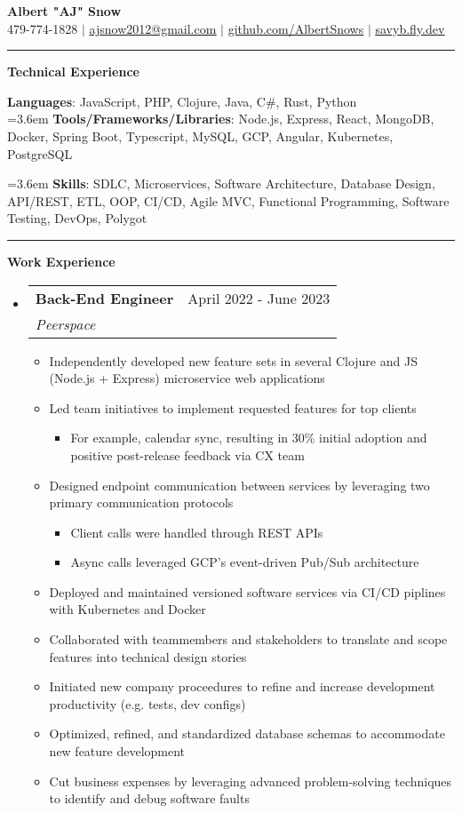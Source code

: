 \documentclass[letterpaper,11pt]{article}
\makeatletter
\newcommand{\resumeItem}[1]{
  \item\small{
    {#1 \vspace{-2pt}}
  }
}
\newcommand{\resumeSubheading}[4]{
  \vspace{-2pt}\item
    \begin{tabular*}{0.97\textwidth}[t]{l@{\extracolsep{\fill}}r}
      \textbf{#1} & #2 \\
      \textit{\small#3} & \textit{\small #4} \\
    \end{tabular*}\vspace{0pt}
}
\newcommand{\resumeSubHeadingListStart}{\begin{itemize}[leftmargin=0.15cm, label={}]}
\newcommand{\resumeSubHeadingListEnd}{\end{itemize}}
\newcommand{\resumeItemListStart}{\begin{itemize}}
\newcommand{\resumeItemListEnd}{\end{itemize}\vspace{-5pt}}
\makeatother
\begin{document}
\textbf{\normalshape \Large \textcolor{magic_blue}{Albert "AJ" Snow}} \\ \vspace{3pt}
\small 479-774-1828 $|$ 
\href{ mailto:ajsnow2012@gmail.com }
{\underline{ajsnow2012@gmail.com}} $|$
\href{https://github.com/AlbertSnows}{\underline{github.com/AlbertSnows}}
$|$ \href{https://savyb.fly.dev/}{\underline{savyb.fly.dev}}
\noindent\rule{19.5cm}{0.4pt}


%
\textbf{\large \textcolor{magic_blue}{Technical Experience} }
\begin{onehalfspace}

    \textbf{ Languages}{: JavaScript, PHP, Clojure, Java, 
    C\#, Rust, Python } \\

    \hangindent=3.6em
    \textbf{ Tools/Frameworks/Libraries}{: 
    Node.js, Express, React, MongoDB, Docker, Spring Boot, 
    Typescript, MySQL, GCP, Angular, Kubernetes, PostgreSQL } \\
\end{onehalfspace}

\hangindent=3.6em
\textbf{ Skills}{: }
SDLC, Microservices, Software Architecture, Database Design, 
API/REST,  ETL, 
OOP, CI/CD, Agile
MVC, Functional Programming, Software Testing, 
DevOps, Polygot

\noindent\rule{19.5cm}{0.4pt}

\textbf{\large \textcolor{magic_blue}{Work Experience}}
\resumeSubHeadingListStart
\resumeSubheading
{Back-End Engineer}{April 2022 - June 2023}
{Peerspace}{}
\resumeItemListStart
\resumeItem{ Independently developed new feature sets in several Clojure and JS (Node.js + Express) microservice web applications}
\resumeItem{ Led team initiatives to implement requested features for top clients }
\begin{itemize}
  \item For example, calendar sync, resulting in 30\% initial adoption and positive post-release feedback via CX team
\end{itemize}
\resumeItem{ Designed endpoint communication between services by leveraging two primary communication protocols}
\begin{itemize}
  \item Client calls were handled through REST APIs
  \item Async calls leveraged GCP's event-driven Pub/Sub architecture
\end{itemize}
\resumeItem{ Deployed and maintained versioned software services via CI/CD piplines with Kubernetes and Docker }
\resumeItem{ Collaborated with teammembers and stakeholders to translate and scope features into technical design stories}
\resumeItem{ Initiated new company proceedures to refine and increase development productivity (e.g. tests, dev configs)}
\resumeItem{ Optimized, refined, and standardized database schemas to accommodate new feature development}
\resumeItem{ Cut business expenses by leveraging advanced problem-solving techniques to identify and debug software faults}
\resumeItemListEnd
\resumeSubHeadingListEnd
\end{document}
